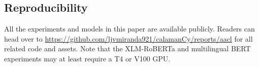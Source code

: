 \documentclass[11pt]{article}
\begin{document}
\subsection{Reproducibility}

All the experiments and models in this paper are available publicly.
Readers can head over to \url{https://github.com/ljvmiranda921/calamanCy/reports/aacl} for all related code and assets.
Note that the XLM-RoBERTa and multilingual BERT experiments may at least require a T4 or V100 GPU.
\end{document}
